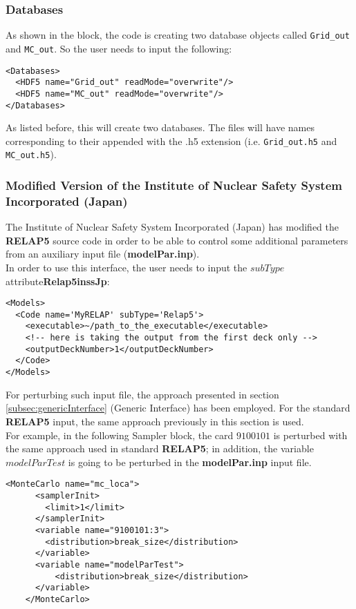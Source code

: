 \subsubsection{Databases}
As shown in the  block, the code is creating two database objects
called \texttt{Grid\_out} and \texttt{MC\_out}.
%
So the user needs to input the following:
\begin{lstlisting}[style=XML]
<Databases>
  <HDF5 name="Grid_out" readMode="overwrite"/>
  <HDF5 name="MC_out" readMode="overwrite"/>
</Databases>
\end{lstlisting}
As listed before, this will create two databases.
%
The files will have names corresponding to their  appended with
the .h5 extension (i.e. \texttt{Grid\_out.h5} and \texttt{MC\_out.h5}).

\subsubsection{Modified Version of the Institute of Nuclear Safety System Incorporated (Japan)}
The Institute of Nuclear Safety System Incorporated (Japan) has modified the \textbf{RELAP5}  source code
in order to be able to control some additional parameters from an auxiliary input file (\textbf{modelPar.inp}).
\\In order to use this interface, the user needs to input the $subType$ attribute\textbf{Relap5inssJp}:
\begin{lstlisting}[style=XML]
<Models>
  <Code name='MyRELAP' subType='Relap5'>
    <executable>~/path_to_the_executable</executable>
    <!-- here is taking the output from the first deck only -->
    <outputDeckNumber>1</outputDeckNumber>
  </Code>
</Models>
\end{lstlisting}
For perturbing such input file, the approach presented in section \ref{subsec:genericInterface} (Generic Interface)
has been employed. For the standard \textbf{RELAP5} input, the same approach previously in this section is used.
\\For example, in the following Sampler block, the card $9100101$ is perturbed with the same approach used in standard \textbf{RELAP5}; in addition, the variable $modelParTest$  is going to be perturbed in the \textbf{modelPar.inp} input file.
\begin{lstlisting}[style=XML]
    <MonteCarlo name="mc_loca">
      <samplerInit>
        <limit>1</limit>
      </samplerInit>
      <variable name="9100101:3">
        <distribution>break_size</distribution>
      </variable>
      <variable name="modelParTest">
          <distribution>break_size</distribution>
      </variable>
    </MonteCarlo>
\end{lstlisting}

